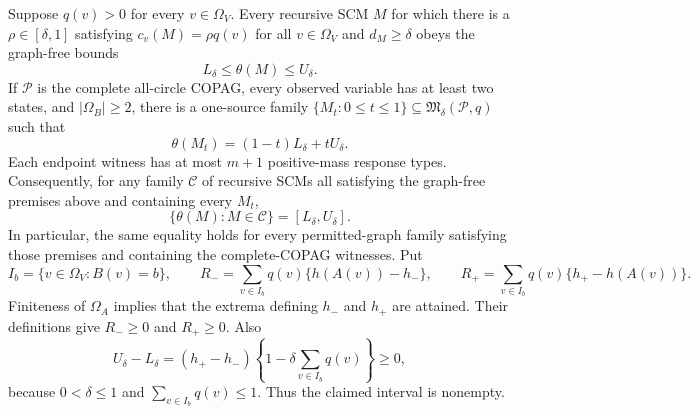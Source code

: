 Suppose \(q(v)>0\) for every \(v\in\Omega_V\).  Every recursive SCM \(M\) for which there is a \(\rho\in[\delta,1]\) satisfying \(c_v(M)=\rho q(v)\) for all \(v\in\Omega_V\) and \(d_M\geq\delta\) obeys the graph-free bounds
\[
L_\delta\leq\theta(M)\leq U_\delta.
\]
If \(\mathcal P\) is the complete all-circle COPAG, every observed variable has at least two states, and \(|\Omega_B|\geq2\), there is a one-source family \(\{M_t:0\leq t\leq1\}\subseteq\mathfrak M_\delta(\mathcal P,q)\) such that
\[
\theta(M_t)=(1-t)L_\delta+tU_\delta.
\]
Each endpoint witness has at most \(m+1\) positive-mass response types.  Consequently, for any family \(\mathscr C\) of recursive SCMs all satisfying the graph-free premises above and containing every \(M_t\),
\[
\{\theta(M):M\in\mathscr C\}=[L_\delta,U_\delta].
\]
In particular, the same equality holds for every permitted-graph family satisfying those premises and containing the complete-COPAG witnesses.
Put
\[
I_b=\{v\in\Omega_V:B(v)=b\},\qquad
R_- =\sum_{v\in I_b}q(v)\{h(A(v))-h_-\},\qquad
R_+ =\sum_{v\in I_b}q(v)\{h_+-h(A(v))\}.
\]
Finiteness of \(\Omega_A\) implies that the extrema defining \(h_-\) and \(h_+\) are attained.  Their definitions give \(R_-\geq0\) and \(R_+\geq0\).  Also
\[
U_\delta-L_\delta
=(h_+-h_-)\left\{1-\delta\sum_{v\in I_b}q(v)\right\}\geq0,
\]
because \(0<\delta\leq1\) and \(\sum_{v\in I_b}q(v)\leq1\).  Thus the claimed interval is nonempty.

